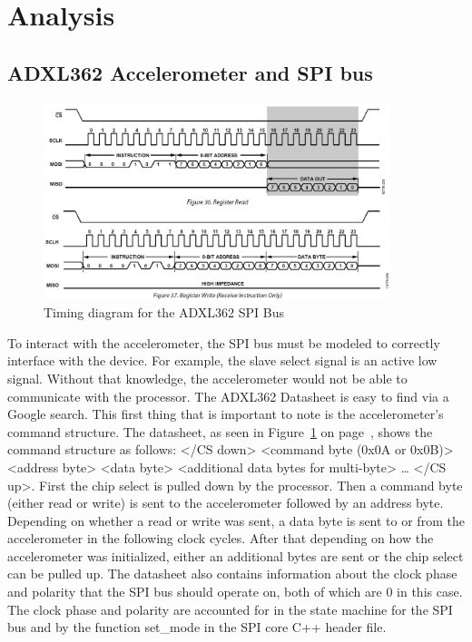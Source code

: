 \documentclass{article}
\begin{document}
\section{Analysis}
\subsection{ADXL362 Accelerometer and SPI bus}
\begin{figure}
\begin{center}
\caption{Timing diagram for the ADXL362 SPI Bus}\label{fig:AccelTiming}
\includegraphics[width=0.9\textwidth]{Timing.jpg}
\end{center}
\end{figure}
To interact with the accelerometer, the SPI bus must be modeled to correctly interface with the device. For example, the slave select signal is an active low signal. Without that knowledge, the accelerometer would not be able to communicate with the processor. The ADXL362 Datasheet is easy to find via a Google search. This first thing that is important to note is the accelerometer's command structure. The datasheet, as seen in Figure~\ref{fig:AccelTiming} on page~\pageref{fig:AccelTiming}, shows the command structure as follows: </CS down> <command byte (0x0A or 0x0B)> <address byte> <data byte> <additional data bytes for multi-byte> … </CS up>. First the chip select is pulled down by the processor. Then a command byte (either read or write) is sent to the accelerometer followed by an address byte. Depending on whether a read or write was sent, a data byte is sent to or from the accelerometer in the following clock cycles. After that depending on how the accelerometer was initialized, either an additional bytes are sent or the chip select can be pulled up. The datasheet also contains information about the clock phase and polarity that the SPI bus should operate on, both of which are 0 in this case. The clock phase and polarity are accounted for in the state machine for the SPI bus and by the function set\_mode in the SPI core C++ header file.
  
\end{document}
